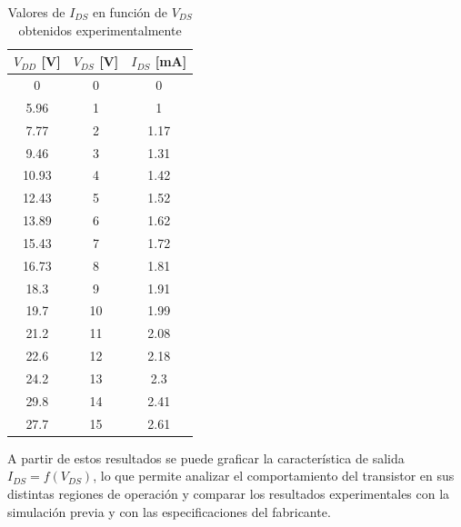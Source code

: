     \begin{table}[H]
    \centering
    \begin{tabular}{|c|c|c|}
    \hline
    \textbf{$V_{DD}$ [V]}  &  \textbf{ $V_{DS}$ [V]} & \textbf{$I_{DS}$ [mA]} \\ \hline
    0      &    0   & 0     \\ \hline
    5.96   &    1   & 1     \\ \hline
    7.77   &    2   & 1.17  \\ \hline
    9.46   &    3   & 1.31  \\ \hline
    10.93  &    4   & 1.42  \\ \hline
    12.43  &    5   & 1.52  \\ \hline
    13.89  &    6   & 1.62  \\ \hline
    15.43  &    7   & 1.72  \\ \hline
    16.73  &    8   & 1.81  \\ \hline
    18.3   &    9   & 1.91  \\ \hline
    19.7   &    10  & 1.99  \\ \hline
    21.2   &    11  & 2.08  \\ \hline
    22.6   &    12  & 2.18  \\ \hline
    24.2   &    13  & 2.3   \\ \hline
    29.8   &    14  & 2.41  \\ \hline
    27.7   &    15  & 2.61  \\ \hline
    \end{tabular}
    \caption{Valores de $I_{DS}$ en función de $V_{DS}$ obtenidos experimentalmente}
    \label{tab:ids-vds}
    \end{table}
    
    A partir de estos resultados se puede graficar la característica de salida $I_{DS} = f(V_{DS})$, 
    lo que permite analizar el comportamiento del transistor en sus distintas regiones de operación 
    y comparar los resultados experimentales con la simulación previa y con las especificaciones del fabricante.
